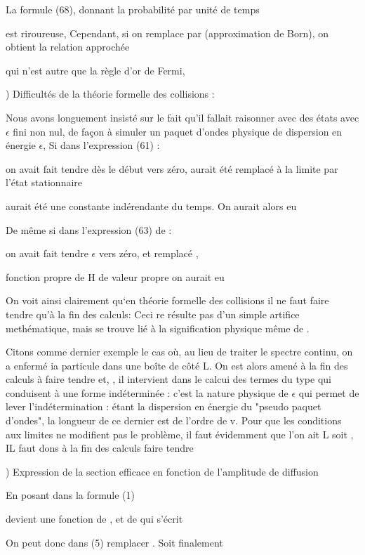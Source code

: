 {{{La formule (68), donnant la probabilité par unité de temps 

est riroureuse, Cependant, si on remplace  par 
(approximation de Born), on obtient la relation approchée

qui n'est autre que la règle d'or de Fermi,

) Difficultés de la théorie formelle des collisions :

Nous avons longuement insisté sur le fait qu'il fallait raisonner
avec des états  avec $\epsilon$ fini non nul, de façon à simuler un paquet
d'ondes physique de dispersion en énergie $\epsilon$, Si dans l'expression (61) :

on avait fait tendre dès le début  vers zéro, aurait été remplacé à la limite par
l'état stationnaire 

aurait été une constante indérendante du temps. On aurait alors eu 


De même si dans l'expression (63) de  :

on avait fait tendre $\epsilon$ vers zéro, et remplacé ,

fonction propre de H de valeur propre on aurait eu

On voit ainsi clairement qu‘en théorie formelle des collisions
il ne faut faire tendre  qu'à la fin des calculs: Ceci re résulte
pas d'un simple artifice methématique, mais se trouve lié à la signification
physique même de .

Citons comme dernier exemple le cas où, au lieu de traiter le
spectre continu, on a enfermé ia particule dans une boîte de côté L. On
est alors amené à la fin des calculs à faire tendre  et, , il
intervient dans le calcui des termes du type  qui conduisent à une forme
indéterminée : c'est la nature physique de $\epsilon$ qui permet de lever l'indétermination : 
étant la dispersion en énergie du "pseudo paquet d'ondes", la
longueur de ce dernier est de l'ordre de v. Pour que les conditions aux
limites ne modifient pas le problème, il faut évidemment que l'on ait L 
soit , IL faut dons à la fin des calculs faire tendre

) Expression de la section efficace en fonction de l'amplitude  de diffusion

En posant dans la formule (1)

 

devient une fonction de , et de  qui s'écrit

On peut donc dans (5) remplacer . Soit finalement

}}}
